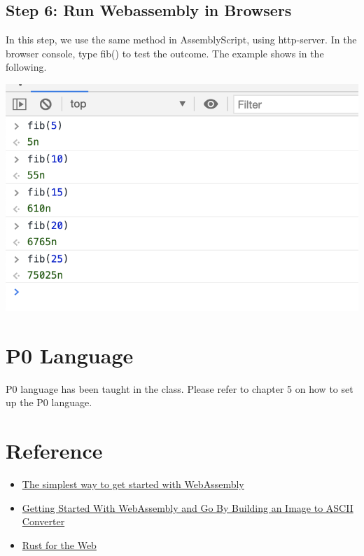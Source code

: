 \documentclass[12pt]{article}
\begin{document}
\subsection{Step 6: Run Webassembly in Browsers}
In this step, we use the same method in AssemblyScript, using http-server. In the browser console, type fib() to test 
the outcome. The example shows in the following.
~\newline

\includegraphics[scale = 0.6]{img/rust-browser}

\pagebreak
\section{P0 Language}
P0 language has been taught in the class. Please refer to chapter 5 on how to set up the P0 
language.

\pagebreak
\section{Reference}
\begin{itemize}
    \item \href{https://medium.com/@BenedekGagyi/the-simplest-way-to-get-started-with-webassembly-1f92f6f90d24}{The simplest way to get started with WebAssembly}
    \item \href{https://medium.com/swlh/getting-started-with-webassembly-and-go-by-building-an-image-to-ascii-converter-dea10bdf71f6}{Getting Started With WebAssembly and Go By Building an Image to ASCII Converter}
    \item \href{https://www.hellorust.com/setup/wasm-target/}{Rust for the Web}
\end{itemize}
\end{document}
